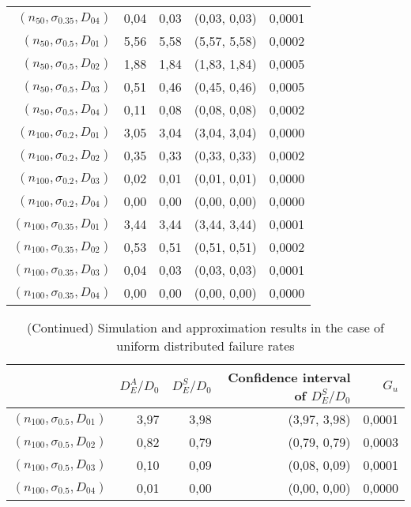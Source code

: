 \documentclass[preprint,12pt]{elsarticle}
\begin{document}
\begin{table}[htbp]
\begin{tabular}{rrrcr}
    $(n_{50},\sigma_{0.35},D_{04})$ & 0,04  & 0,03  & (0,03, 0,03) & 0,0001\\
    $(n_{50},\sigma_{0.5},D_{01})$ & 5,56  & 5,58  & (5,57, 5,58) & 0,0002 \\
    $(n_{50},\sigma_{0.5},D_{02})$  & 1,88  & 1,84  & (1,83, 1,84) & 0,0005 \\
    $(n_{50},\sigma_{0.5},D_{03})$ & 0,51  & 0,46  & (0,45, 0,46) & 0,0005 \\
    $(n_{50},\sigma_{0.5},D_{04})$ & 0,11  & 0,08  & (0,08, 0,08) & 0,0002 \\
    $(n_{100},\sigma_{0.2},D_{01})$  & 3,05  & 3,04  & (3,04, 3,04) & 0,0000 \\
    $(n_{100},\sigma_{0.2},D_{02})$ & 0,35  & 0,33  & (0,33, 0,33) & 0,0002 \\
    $(n_{100},\sigma_{0.2},D_{03})$ & 0,02  & 0,01  & (0,01, 0,01) & 0,0000 \\
    $(n_{100},\sigma_{0.2},D_{04})$ & 0,00  & 0,00  & (0,00, 0,00) & 0,0000 \\
    $(n_{100},\sigma_{0.35},D_{01})$ & 3,44  & 3,44  & (3,44, 3,44) & 0,0001 \\
    $(n_{100},\sigma_{0.35},D_{02})$ & 0,53  & 0,51  & (0,51, 0,51) & 0,0002 \\
    $(n_{100},\sigma_{0.35},D_{03})$ & 0,04  & 0,03  & (0,03, 0,03) & 0,0001 \\
    $(n_{100},\sigma_{0.35},D_{04})$ & 0,00  & 0,00  & (0,00, 0,00) & 0,0000 \\
    \bottomrule
    \end{tabular}%
  \label{uniform1}%
\end{table}%

\begin{table}[htbp]
  \centering
  \caption{(Continued) Simulation and approximation results in the case of uniform distributed failure rates}
    \begin{tabular}{rrrrr}
     \toprule
          & $D_{E}^{A}/D_0$ & $D_{E}^{S}/D_0$ & Confidence interval of $D_{E}^{S}/D_0$ &  $G_{u}$ \\
    \midrule
    $(n_{100},\sigma_{0.5},D_{01})$  & 3,97  & 3,98  & (3,97, 3,98) & 0,0001 \\
    $(n_{100},\sigma_{0.5},D_{02})$ & 0,82  & 0,79  & (0,79, 0,79) & 0,0003 \\
    $(n_{100},\sigma_{0.5},D_{03})$ & 0,10  & 0,09  & (0,08, 0,09) & 0,0001\\
    $(n_{100},\sigma_{0.5},D_{04})$ & 0,01  & 0,00  & (0,00, 0,00) & 0,0000 \\
    \bottomrule
    \end{tabular}%
  \label{uniform2}%
\end{table}%
\end{document}
